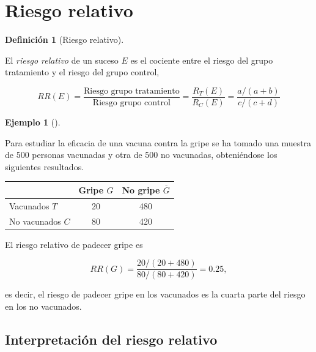 \documentclass[
  spanish,
  a4paper,
]{scrreport}
\newcounter{none} %
\theoremstyle{definition}
\newtheorem{definition}{Definición}[chapter]
\theoremstyle{definition}
\newtheorem{example}{Ejemplo}[chapter]
\theoremstyle{remark}
\begin{document}
\section{Riesgo relativo}\label{riesgo-relativo}

\begin{definition}[Riesgo
relativo]\protect\hypertarget{def-riesgo-relativo}{}\label{def-riesgo-relativo}

El \emph{riesgo relativo} de un suceso \(E\) es el cociente entre el
riesgo del grupo tratamiento y el riesgo del grupo control,

\[RR(E)=\frac{\mbox{Riesgo grupo tratamiento}}{\mbox{Riesgo grupo control}}=\frac{R_T(E)}{R_C(E)}=\frac{a/(a+b)}{c/(c+d)}\]

\end{definition}

\begin{example}[]\protect\hypertarget{exm-riesgo-relativo}{}\label{exm-riesgo-relativo}

Para estudiar la eficacia de una vacuna contra la gripe se ha tomado una
muestra de 500 personas vacunadas y otra de 500 no vacunadas,
obteniéndose los siguientes resultados.

{\def\LTcaptype{none} %
\begin{longtable}[]{@{}lcc@{}}
\toprule\noalign{}
& Gripe \(G\) & No gripe \(\overline{G}\) \\
\midrule\noalign{}
\endhead
\bottomrule\noalign{}
\endlastfoot
Vacunados \(T\) & 20 & 480 \\
No vacunados \(C\) & 80 & 420 \\
\end{longtable}
}

El riesgo relativo de padecer gripe es

\[RR(G) = \frac{20/(20+480)}{80/(80+420)} = 0.25,\]

es decir, el riesgo de padecer gripe en los vacunados es la cuarta parte
del riesgo en los no vacunados.

\end{example}

\subsection{Interpretación del riesgo
relativo}\label{interpretaciuxf3n-del-riesgo-relativo}
\end{document}
